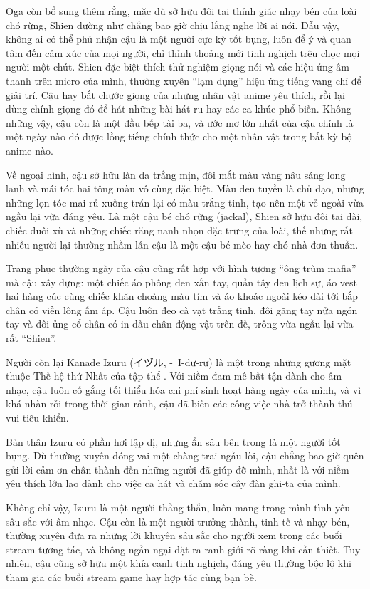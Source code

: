 \documentclass[../main.tex]{subfiles}
\begin{document}
Oga còn bổ sung thêm rằng, mặc dù sở hữu đôi tai thính giác nhạy bén của loài chó rừng, Shien dường như chẳng bao giờ chịu lắng nghe lời ai nói. Dẫu vậy, không ai có thể phủ nhận cậu là một người cực kỳ tốt bụng, luôn để ý và quan tâm đến cảm xúc của mọi người, chỉ thỉnh thoảng mới tinh nghịch trêu chọc mọi người một chút. Shien đặc biệt thích thử nghiệm giọng nói và các hiệu ứng âm thanh trên micro của mình, thường xuyên ``lạm dụng'' hiệu ứng tiếng vang chỉ để giải trí. Cậu hay bắt chước giọng của những nhân vật anime yêu thích, rồi lại dùng chính giọng đó để hát những bài hát ru hay các ca khúc phổ biến. Không những vậy, cậu còn là một đầu bếp tài ba, và ước mơ lớn nhất của cậu chính là một ngày nào đó được lồng tiếng chính thức cho một nhân vật trong bất kỳ bộ anime nào.

Về ngoại hình, cậu sở hữu làn da trắng mịn, đôi mắt màu vàng nâu sáng long lanh và mái tóc hai tông màu vô cùng đặc biệt. Màu đen tuyền là chủ đạo, nhưng những lọn tóc mai rủ xuống trán lại có màu trắng tinh, tạo nên một vẻ ngoài vừa ngầu lại vừa đáng yêu. Là một cậu bé chó rừng (jackal), Shien sở hữu đôi tai dài, chiếc đuôi xù và những chiếc răng nanh nhọn đặc trưng của loài, thế nhưng rất nhiều người lại thường nhầm lẫn cậu là một cậu bé mèo hay chó nhà đơn thuần.

Trang phục thường ngày của cậu cũng rất hợp với hình tượng ``ông trùm mafia'' mà cậu xây dựng: một chiếc áo phông đen xắn tay, quần tây đen lịch sự, áo vest hai hàng cúc cùng chiếc khăn choàng màu tím và áo khoác ngoài kéo dài tới bắp chân có viền lông ấm áp. Cậu luôn đeo cà vạt trắng tinh, đôi găng tay nửa ngón tay và đôi ủng cổ chân có in dấu chân động vật trên đế, trông vừa ngầu lại vừa rất ``Shien''.

Người còn lại Kanade Izuru (イヅル, -\ I-dư-rư) là một trong những gương mặt thuộc Thế hệ thứ Nhất của tập thể \hls. Với niềm đam mê bất tận dành cho âm nhạc, cậu luôn cố gắng tối thiểu hóa chi phí sinh hoạt hàng ngày của mình, và vì khá nhàn rỗi trong thời gian rảnh, cậu đã biến các công việc nhà trở thành thú vui tiêu khiển.

Bản thân Izuru có phần hơi lập dị, nhưng ẩn sâu bên trong là một người tốt bụng. Dù thường xuyên đóng vai một chàng trai ngầu lòi, cậu chẳng bao giờ quên gửi lời cảm ơn chân thành đến những người đã giúp đỡ mình, nhất là với niềm yêu thích lớn lao dành cho việc ca hát và chăm sóc cây đàn ghi-ta của mình.

Không chỉ vậy, Izuru là một người thẳng thắn, luôn mang trong mình tình yêu sâu sắc với âm nhạc. Cậu còn là một người trưởng thành, tinh tế và nhạy bén, thường xuyên đưa ra những lời khuyên sâu sắc cho người xem trong các buổi stream tương tác, và không ngần ngại đặt ra ranh giới rõ ràng khi cần thiết. Tuy nhiên, cậu cũng sở hữu một khía cạnh tinh nghịch, đáng yêu thường bộc lộ khi tham gia các buổi stream game hay hợp tác cùng bạn bè.
\end{document}
